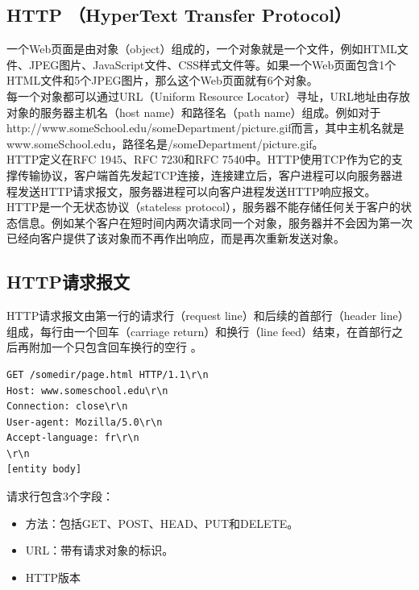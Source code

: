 \subsection{HTTP （HyperText Transfer Protocol）}

一个Web页面是由对象（object）组成的，一个对象就是一个文件，例如HTML文件、JPEG图片、JavaScript文件、CSS样式文件等。如果一个Web页面包含1个HTML文件和5个JPEG图片，那么这个Web页面就有6个对象。\\

每一个对象都可以通过URL（Uniform Resource Locator）寻址，URL地址由存放对象的服务器主机名（host name）和路径名（path name）组成。例如对于http://www.someSchool.edu/someDepartment/picture.gif而言，其中主机名就是www.someSchool.edu，路径名是/someDepartment/picture.gif。\\

HTTP定义在RFC 1945、RFC 7230和RFC 7540中。HTTP使用TCP作为它的支撑传输协议，客户端首先发起TCP连接，连接建立后，客户进程可以向服务器进程发送HTTP请求报文，服务器进程可以向客户进程发送HTTP响应报文。\\

HTTP是一个无状态协议（stateless protocol），服务器不能存储任何关于客户的状态信息。例如某个客户在短时间内两次请求同一个对象，服务器并不会因为第一次已经向客户提供了该对象而不再作出响应，而是再次重新发送对象。\\

\subsection{HTTP请求报文}

HTTP请求报文由第一行的请求行（request line）和后续的首部行（header line）组成，每行由一个回车（carriage return）和换行（line feed）结束，在首部行之后再附加一个只包含回车换行的空行 。\\


\begin{lstlisting}
GET /somedir/page.html HTTP/1.1\r\n
Host: www.someschool.edu\r\n
Connection: close\r\n
User-agent: Mozilla/5.0\r\n
Accept-language: fr\r\n
\r\n
[entity body]
\end{lstlisting}

请求行包含3个字段：

\begin{itemize}
    \item 方法：包括GET、POST、HEAD、PUT和DELETE。

    \item URL：带有请求对象的标识。

    \item HTTP版本
\end{itemize}

